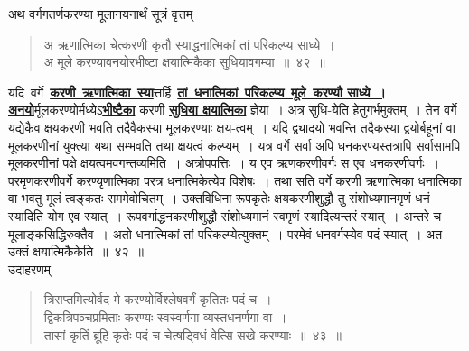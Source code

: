 \documentclass[11pt, openany]{book}
\begin{document}
{{\vspace{-2mm}
{\bqt अथ वर्गगतर्णकरण्या मूलानयनार्थं सूत्रं वृत्तम्\textendash }

 \label{42}
\begin{quote}
{\color{white}अ} \hspace{-10mm} {\ab ऋणात्मिका चेत्करणी कृतौ स्याद्धनात्मिकां तां परिकल्प्य साध्ये~।} \\
{\color{white}अ} \hspace{-10mm} {\ab मूले करण्यावनयोरभीष्टा क्षयात्मिकैका सुधियावगम्या~॥~४२~॥}
\end{quote}

 यदि \,वर्गे \,\hyperref[42]{\textbf{करणी \,ऋणात्मिका \,स्या}}त्तर्हि \,\hyperref[42]{\textbf{तां \,धनात्मिकां \,परिकल्प्य \,मूले \,करण्यौ साध्ये~। अनयो}}र्मूलकरण्योर्मध्येऽ\hyperref[42]{\textbf{भीष्टैका}} करणी \hyperref[42]{\textbf{सुधिया क्षयात्मिका}} ज्ञेया~। अत्र सुधि-येति हेतुगर्भमुक्तम्~। तेन वर्गे यद्येकैव क्षयकरणी भवति तदैवैकस्या मूलकरण्याः क्षय-त्वम्~। यदि द्व्यादयो भवन्ति तदैकस्या
द्वयोर्बहूनां वा मूलकरणीनां युक्त्या यथा सम्भवति तथा क्षयत्वं कल्प्यम्~। यत्र वर्गे सर्वा अपि धनकरण्यस्तत्रापि सर्वासामपि मूलकरणीनां पक्षे क्षयत्वमवगन्तव्यमिति~।
अत्रोपपत्तिः~। य एव ऋणकरणीवर्गः स एव धनकरणीवर्गः~। परमृणकरणीवर्गे करण्यृणात्मिका परत्र धनात्मिकेत्येव विशेषः~। तथा सति वर्गे करणी ऋणात्मिका धनात्मिका वा भवतु मूलं त्वङ्कतः सममेवोचितम्~। उक्तविधिना रूपकृतेः क्षयकरणीशुद्धौ तु संशोध्यमानमृणं धनं स्यादिति योग एव स्यात्~। रूपवर्गाद्धनकरणीशुद्धौ
संशोध्यमानं स्वमृणं स्यादित्यन्तरं स्यात्~। अन्तरे च मूलाङ्कसिद्धिरुक्तैव~। अतो
धनात्मिकां तां परिकल्प्येत्युक्तम्~। परमेवं धनवर्गस्येव पदं स्यात्~। अत
उक्तं क्षयात्मिकैकेति~॥~४२~॥\\

\vspace{-2mm}
{\bqt उदाहरणम्\textendash }
\newpage

\begin{quote}
    \eg 
\hspace{-1cm} त्रिसप्तमित्योर्वद मे करण्योर्विश्लेषवर्गं कृतितः पदं च~। \\
    
    \vspace{-7mm}
\hspace{-1cm} द्विकत्रिपञ्चप्रमिताः करण्यः स्वस्वर्णगा व्यस्तधनर्णगा वा~। \\

\vspace{-7mm}
\hspace{-1cm} तासां कृतिं ब्रूहि कृतेः पदं च चेत्षड्विधं वेत्सि सखे करण्याः~॥~४३~॥
\end{quote}

}}
\end{document}
